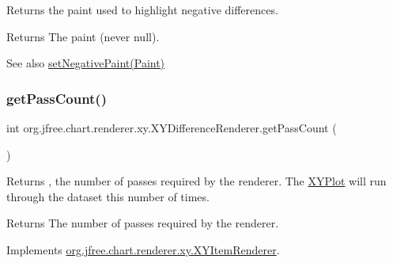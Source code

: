 Returns the paint used to highlight negative differences.

\begin{DoxyReturn}{Returns}
The paint (never {\ttfamily null}).
\end{DoxyReturn}
\begin{DoxySeeAlso}{See also}
\mbox{\hyperlink{classorg_1_1jfree_1_1chart_1_1renderer_1_1xy_1_1_x_y_difference_renderer_adb29167bb5918e400d750c52a5c608e3}{set\+Negative\+Paint(\+Paint)}} 
\end{DoxySeeAlso}
\mbox{\label{classorg_1_1jfree_1_1chart_1_1renderer_1_1xy_1_1_x_y_difference_renderer_af088bc6e1bb9053e14e3396d2fab0927}} 
\subsubsection{\texorpdfstring{get\+Pass\+Count()}{getPassCount()}}
{\footnotesize\ttfamily int org.\+jfree.\+chart.\+renderer.\+xy.\+X\+Y\+Difference\+Renderer.\+get\+Pass\+Count (\begin{DoxyParamCaption}{ }\end{DoxyParamCaption})}

Returns {}, the number of passes required by the renderer. The \mbox{\hyperlink{}{X\+Y\+Plot}} will run through the dataset this number of times.

\begin{DoxyReturn}{Returns}
The number of passes required by the renderer. 
\end{DoxyReturn}


Implements \mbox{\hyperlink{interfaceorg_1_1jfree_1_1chart_1_1renderer_1_1xy_1_1_x_y_item_renderer_afe42489776da2a4c7e64838382bbaea1}{org.\+jfree.\+chart.\+renderer.\+xy.\+X\+Y\+Item\+Renderer}}.

\mbox{\label{classorg_1_1jfree_1_1chart_1_1renderer_1_1xy_1_1_x_y_difference_renderer_a6af43e7afd9ffcacb0d8569d7826902b}} 
